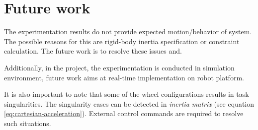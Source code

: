 \section{Future work}
The experimentation results do not provide expected motion/behavior of system. The possible reasons for this are rigid-body inertia specification or constraint calculation. The future work is to resolve these issues and. 

Additionally, in the project, the experimentation is conducted in simulation environment, future work aims at real-time implementation on robot platform. 

It is also important to note that some of the wheel configurations results in task singularities. The singularity cases can be detected in \textit{inertia matrix} (see equation \ref{eq:cartesian-acceleration}). External control commands are required to resolve such situations.

